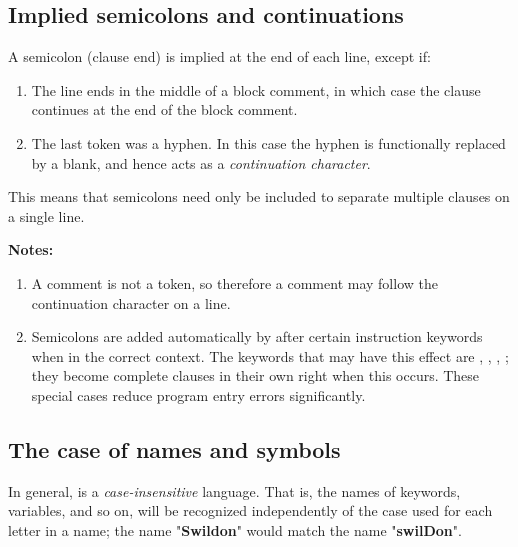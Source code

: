 \subsection{Implied semicolons and continuations}\label{refsemis}
 A semicolon (clause end) is implied at the end of each line, except
if:
\begin{enumerate}
\item The line ends in the middle of a block comment, in which case the
clause continues at the end of the block comment.
\item The last token was a hyphen.
In this case the hyphen is functionally replaced by a blank, and hence
acts as a \emph{continuation character}.
\end{enumerate}
 This means that semicolons need only be included to separate
multiple clauses on a single line.
\begin{shaded}\noindent
\textbf{Notes:}
\begin{enumerate}
\item A comment is not a token, so therefore a comment may follow the
continuation character on a line.
\item Semicolons are added automatically by \nr{} after certain
instruction keywords when in the correct context.
The keywords that may have this effect are ,
, , ; they become
complete clauses in their own right when this occurs.
These special cases reduce program entry errors significantly.
\end{enumerate}
\end{shaded}\indent
\subsection{The case of names and symbols}\label{refcase}
 
In general, \nr{} is a \emph{case-insensitive} language.
That is, the names of keywords, variables, and so on, will be recognized
independently of the case used for each letter in a name; the name
"\textbf{Swildon}" would match the name
"\textbf{swilDon}".
 
